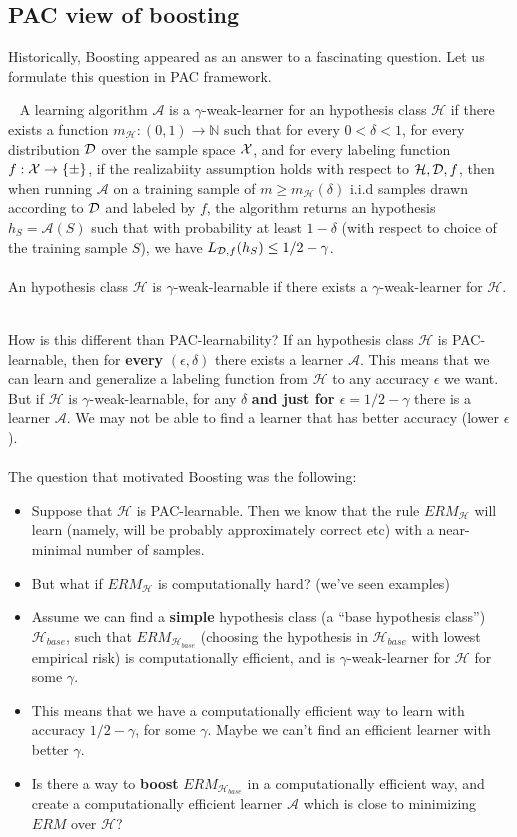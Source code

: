 \documentclass[11pt]{article}
\newcommand{\Ac}{\mathcal{A}}
\newcommand{\Hc}{\mathcal{H}}
\begin{document}
\subsection{PAC view of boosting}


Historically, Boosting appeared as an answer to a fascinating question. Let us
formulate this question in PAC framework.

\begin{definition}  ~
A learning algorithm $\Ac$ is
a $\gamma$-weak-learner for an hypothesis class $\Hc$ 
if there exists a function $m_\Hc:(0,1)\to\mathbb{N}$ such that for every
$0<\delta<1$, for every distribution $\mathcal{D}$ over the sample space $\mathcal{X}$, and for
every labeling function $f:\mathcal{X}\to\left\{ \pm \right\}$, if the realizabiity
assumption holds with respect to $\Hc,\D,f$, then when running $\Ac$ on a
training sample of $m\geq m_\Hc(\delta)$ i.i.d samples drawn according to $\mathcal{D}$ and
labeled by $f$, the algorithm returns an hypothesis $h_S=\Ac(S)$ such that with
probability at least $1-\delta$ (with respect to choice of the training sample
$S$), we have $L_{\mathcal{D},f} (h_S) \leq 1/2-\gamma$. 
\\~\\
An hypothesis class $\Hc$ is $\gamma$-weak-learnable if there exists a
$\gamma$-weak-learner for $\Hc$. 
\end{definition}
~\\
How is this different than PAC-learnability? If an hypothesis class $\Hc$ 
is PAC-learnable, then for {\bf every} $(\epsilon,\delta)$ there exists a
learner $\Ac$. This means that we can learn and generalize a labeling function
from $\Hc$ to any accuracy $\epsilon$ we want. But if $\Hc$ is
$\gamma$-weak-learnable, for any $\delta$ {\bf and just for
$\epsilon=1/2-\gamma$}
there is a learner $\Ac$.
We may not be able to find a learner that has better
accuracy (lower
$\epsilon$). 
\\~\\
The question that motivated Boosting was the following: 
\begin{itemize}
  \item Suppose that $\Hc$ is PAC-learnable. Then we know that the rule
    $ERM_{\Hc}$ will learn (namely, will be probably approximately correct etc)
    with a near-minimal number of samples.
  \item But what if $ERM_\Hc$ is computationally hard? (we've seen examples)
  \item Assume we can find a {\bf simple} hypothesis class (a ``base hypothesis class'')
    $\Hc_{base}$, such that $ERM_{\Hc_{base}}$ 
    (choosing the hypothesis in $\Hc_{base}$ with lowest empirical risk) is
    computationally efficient, and is
    $\gamma$-weak-learner for $\Hc$ for some $\gamma$.
  \item This means that we have a computationally efficient way to learn with
    accuracy $1/2-\gamma$, for some $\gamma$. Maybe we can't 
    find an efficient learner with better $\gamma$.
  \item Is there a way to {\bf boost} $ERM_{\Hc_{base}}$ in a computationally
    efficient way, 
  and create a computationally efficient learner $\Ac$ 
  which is close to minimizing $ERM$ over $\Hc$?
\end{itemize}
\end{document}
